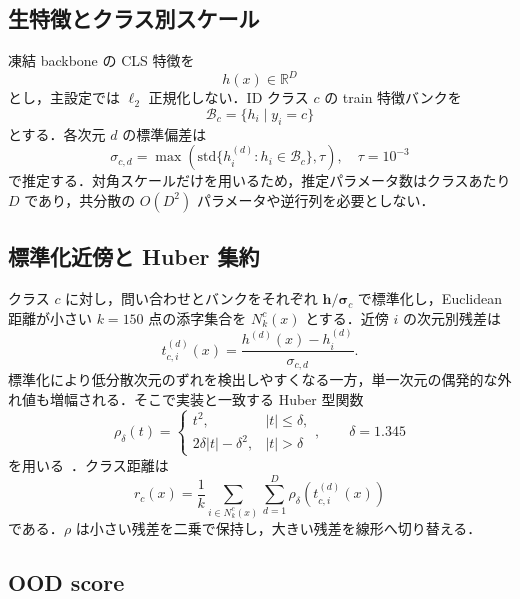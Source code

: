 \documentclass[uplatex,dvipdfmx,a4paper,10pt,twocolumn]{bxjsarticle}
\newcommand{\R}{\mathbb{R}}
\begin{document}
\subsection{生特徴とクラス別スケール}

凍結 backbone の CLS 特徴を
\begin{equation}
  h(x)\in\R^D
\end{equation}
とし，主設定では $\ell_2$ 正規化しない．ID クラス $c$ の train 特徴バンクを
\begin{equation}
  \mathcal{B}_c=\{h_i\mid y_i=c\}
\end{equation}
とする．各次元 $d$ の標準偏差は
\begin{equation}
  \sigma_{c,d}=\max\!\left(\mathrm{std}\{h_i^{(d)}:h_i\in\mathcal{B}_c\},\tau\right),
  \quad \tau=10^{-3}
  \label{eq:sigma}
\end{equation}
で推定する．対角スケールだけを用いるため，推定パラメータ数はクラスあたり $D$ であり，共分散の $O(D^2)$ パラメータや逆行列を必要としない．

\subsection{標準化近傍と Huber 集約}

クラス $c$ に対し，問い合わせとバンクをそれぞれ $\bm{h}/\bm{\sigma}_c$ で標準化し，Euclidean 距離が小さい $k=150$ 点の添字集合を $N_k^c(x)$ とする．近傍 $i$ の次元別残差は
\begin{equation}
  t_{c,i}^{(d)}(x)=\frac{h^{(d)}(x)-h_i^{(d)}}{\sigma_{c,d}}.
\end{equation}
標準化により低分散次元のずれを検出しやすくなる一方，単一次元の偶発的な外れ値も増幅される．そこで実装と一致する Huber 型関数
\begin{equation}
\rho_\delta(t)=
\begin{cases}
t^2,& |t|\le\delta,\\
2\delta|t|-\delta^2,& |t|>\delta
\end{cases},\qquad \delta=1.345
\label{eq:huber}
\end{equation}
を用いる~\cite{huber1964robust}．クラス距離は
\begin{equation}
  r_c(x)=\frac{1}{k}\sum_{i\in N_k^c(x)}\sum_{d=1}^{D}
  \rho_\delta\!\left(t_{c,i}^{(d)}(x)\right)
  \label{eq:classdistance}
\end{equation}
である．$\rho$ は小さい残差を二乗で保持し，大きい残差を線形へ切り替える．

\subsection{OOD score}
\end{document}
